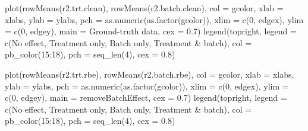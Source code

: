 \documentclass[
]{book}
\newenvironment{Shaded}{\begin{snugshade}}{\end{snugshade}}
\newcommand{\AttributeTok}[1]{\textcolor[rgb]{0.77,0.63,0.00}{#1}}
\newcommand{\DecValTok}[1]{\textcolor[rgb]{0.00,0.00,0.81}{#1}}
\newcommand{\FloatTok}[1]{\textcolor[rgb]{0.00,0.00,0.81}{#1}}
\newcommand{\FunctionTok}[1]{\textcolor[rgb]{0.00,0.00,0.00}{#1}}
\newcommand{\NormalTok}[1]{#1}
\newcommand{\SpecialCharTok}[1]{\textcolor[rgb]{0.00,0.00,0.00}{#1}}
\newcommand{\StringTok}[1]{\textcolor[rgb]{0.31,0.60,0.02}{#1}}
\begin{document}
\begin{Shaded}
\begin{Highlighting}[]
\FunctionTok{plot}\NormalTok{(}\FunctionTok{rowMeans}\NormalTok{(r2.trt.clean), }\FunctionTok{rowMeans}\NormalTok{(r2.batch.clean), }\AttributeTok{col =}\NormalTok{ gcolor, }
     \AttributeTok{xlab =}\NormalTok{ xlabs, }\AttributeTok{ylab =}\NormalTok{ ylabs, }\AttributeTok{pch =} \FunctionTok{as.numeric}\NormalTok{(}\FunctionTok{as.factor}\NormalTok{(gcolor)),}
     \AttributeTok{xlim =} \FunctionTok{c}\NormalTok{(}\DecValTok{0}\NormalTok{, edgex), }\AttributeTok{ylim =} \FunctionTok{c}\NormalTok{(}\DecValTok{0}\NormalTok{, edgey), }
     \AttributeTok{main =} \StringTok{\textquotesingle{}Ground{-}truth data\textquotesingle{}}\NormalTok{, }\AttributeTok{cex =} \FloatTok{0.7}\NormalTok{)}
\FunctionTok{legend}\NormalTok{(}\StringTok{\textquotesingle{}topright\textquotesingle{}}\NormalTok{, }\AttributeTok{legend =} \FunctionTok{c}\NormalTok{(}\StringTok{\textquotesingle{}No effect\textquotesingle{}}\NormalTok{, }\StringTok{\textquotesingle{}Treatment only\textquotesingle{}}\NormalTok{, }
                              \StringTok{\textquotesingle{}Batch only\textquotesingle{}}\NormalTok{, }\StringTok{\textquotesingle{}Treatment \& batch\textquotesingle{}}\NormalTok{), }
       \AttributeTok{col =} \FunctionTok{pb\_color}\NormalTok{(}\DecValTok{15}\SpecialCharTok{:}\DecValTok{18}\NormalTok{), }\AttributeTok{pch =} \FunctionTok{seq\_len}\NormalTok{(}\DecValTok{4}\NormalTok{), }\AttributeTok{cex =} \FloatTok{0.8}\NormalTok{)}

\FunctionTok{plot}\NormalTok{(}\FunctionTok{rowMeans}\NormalTok{(r2.trt.rbe), }\FunctionTok{rowMeans}\NormalTok{(r2.batch.rbe), }\AttributeTok{col =}\NormalTok{ gcolor, }
     \AttributeTok{xlab =}\NormalTok{ xlabs, }\AttributeTok{ylab =}\NormalTok{ ylabs, }\AttributeTok{pch =} \FunctionTok{as.numeric}\NormalTok{(}\FunctionTok{as.factor}\NormalTok{(gcolor)),}
     \AttributeTok{xlim =} \FunctionTok{c}\NormalTok{(}\DecValTok{0}\NormalTok{, edgex), }\AttributeTok{ylim =} \FunctionTok{c}\NormalTok{(}\DecValTok{0}\NormalTok{, edgey), }
     \AttributeTok{main =} \StringTok{\textquotesingle{}removeBatchEffect\textquotesingle{}}\NormalTok{, }\AttributeTok{cex =} \FloatTok{0.7}\NormalTok{)}
\FunctionTok{legend}\NormalTok{(}\StringTok{\textquotesingle{}topright\textquotesingle{}}\NormalTok{, }\AttributeTok{legend =} \FunctionTok{c}\NormalTok{(}\StringTok{\textquotesingle{}No effect\textquotesingle{}}\NormalTok{, }\StringTok{\textquotesingle{}Treatment only\textquotesingle{}}\NormalTok{, }
                              \StringTok{\textquotesingle{}Batch only\textquotesingle{}}\NormalTok{, }\StringTok{\textquotesingle{}Treatment \& batch\textquotesingle{}}\NormalTok{), }
       \AttributeTok{col =} \FunctionTok{pb\_color}\NormalTok{(}\DecValTok{15}\SpecialCharTok{:}\DecValTok{18}\NormalTok{), }\AttributeTok{pch =} \FunctionTok{seq\_len}\NormalTok{(}\DecValTok{4}\NormalTok{), }\AttributeTok{cex =} \FloatTok{0.8}\NormalTok{)}


\end{Highlighting}
\end{Shaded}
\end{document}
